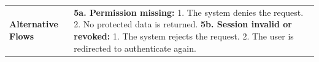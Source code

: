 \begin{longtable}{|>{\raggedright\arraybackslash}p{}|>{\raggedright\arraybackslash}p{}|}
\textbf{Alternative Flows} &
\textbf{5a. Permission missing:} \newline
\hspace*{1em}1. The system denies the request. \newline
\hspace*{1em}2. No protected data is returned. \newline
\textbf{5b. Session invalid or revoked:} \newline
\hspace*{1em}1. The system rejects the request. \newline
\hspace*{1em}2. The user is redirected to authenticate again. \\
\end{longtable}


\renewcommand{\arraystretch}{1.12}
